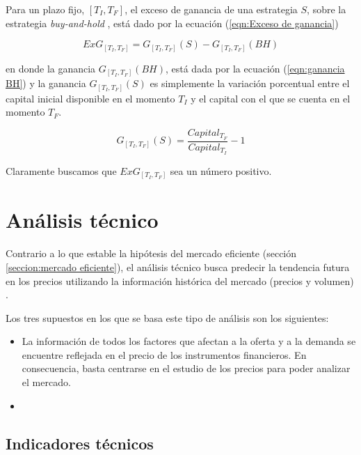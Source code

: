 \documentclass[12pt]{scrbook}
\theoremstyle{break}
\theoremstyle{break}
\newcommand{\buyhold}{\textit{buy-and-hold }}
\begin{document}
Para un plazo fijo, $\left[T_{I}, T_{F}\right]$, el exceso de ganancia de una estrategia $S$, sobre la estrategia \buyhold, está dado por la ecuación (\ref{eqn:Exceso de ganancia})

\begin{equation} \label{eqn:Exceso de ganancia}
ExG_{\left[T_{I}, T_{F}\right]} = G_{\left[T_{I}, T_{F}\right]} (S) - G_{\left[T_{I}, T_{F}\right]} (BH)
\end{equation}

en donde la ganancia $G_{\left[T_{I}, T_{F}\right]} (BH)$, está dada por la ecuación (\ref{eqn:ganancia BH}) y la ganancia $G_{\left[T_{I}, T_{F}\right]} (S)$ es simplemente la variación porcentual entre el capital inicial disponible en el momento $T_{I}$ y el capital con el que se cuenta en el momento $T_{F}$.

\begin{equation} \label{eqn:Ganancia estrategia S}
G_{\left[T_{I}, T_{F}\right]}(S) = \dfrac{Capital_{T_F}}{Capital_{T_I} } - 1 
\end{equation}

Claramente buscamos que $ExG_{\left[T_{I}, T_{F}\right]}$ sea un número positivo.

\section{Análisis técnico}
\label{seccion:analisisTecnico}
Contrario a lo que estable la hipótesis del mercado eficiente (sección \ref{seccion:mercado eficiente}), el análisis técnico busca predecir la tendencia futura en los precios utilizando la información histórica del mercado (precios y volumen) \cite{murphy1999technical}.

Los tres supuestos en los que se basa este tipo de análisis son los siguientes:

\begin{itemize}
\item La información de todos los factores que afectan a la oferta y a la demanda se encuentre reflejada en el precio de los instrumentos financieros. En consecuencia, basta centrarse en el estudio de los precios para poder analizar el mercado.

\item 
\end{itemize}

\subsection{Indicadores técnicos}
\label{subseccion:indicadores tecnicos}
\end{document}
